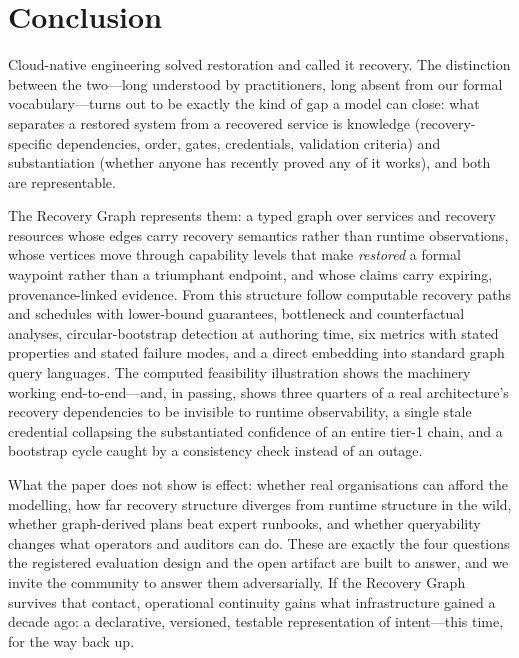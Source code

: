\section{Conclusion}
\label{sec:conclusion}

Cloud-native engineering solved restoration and called it recovery. The distinction between the two---long understood by practitioners, long absent from our formal vocabulary---turns out to be exactly the kind of gap a model can close: what separates a restored system from a recovered service is knowledge (recovery-specific dependencies, order, gates, credentials, validation criteria) and substantiation (whether anyone has recently proved any of it works), and both are representable.

The Recovery Graph represents them: a typed graph over services and recovery resources whose edges carry recovery semantics rather than runtime observations, whose vertices move through capability levels that make \emph{restored} a formal waypoint rather than a triumphant endpoint, and whose claims carry expiring, provenance-linked evidence. From this structure follow computable recovery paths and schedules with lower-bound guarantees, bottleneck and counterfactual analyses, circular-bootstrap detection at authoring time, six metrics with stated properties and stated failure modes, and a direct embedding into standard graph query languages. The computed feasibility illustration shows the machinery working end-to-end---and, in passing, shows three quarters of a real architecture's recovery dependencies to be invisible to runtime observability, a single stale credential collapsing the substantiated confidence of an entire tier-1 chain, and a bootstrap cycle caught by a consistency check instead of an outage.

What the paper does not show is effect: whether real organisations can afford the modelling, how far recovery structure diverges from runtime structure in the wild, whether graph-derived plans beat expert runbooks, and whether queryability changes what operators and auditors can do. These are exactly the four questions the registered evaluation design and the open artifact are built to answer, and we invite the community to answer them adversarially. If the Recovery Graph survives that contact, operational continuity gains what infrastructure gained a decade ago: a declarative, versioned, testable representation of intent---this time, for the way back up.
